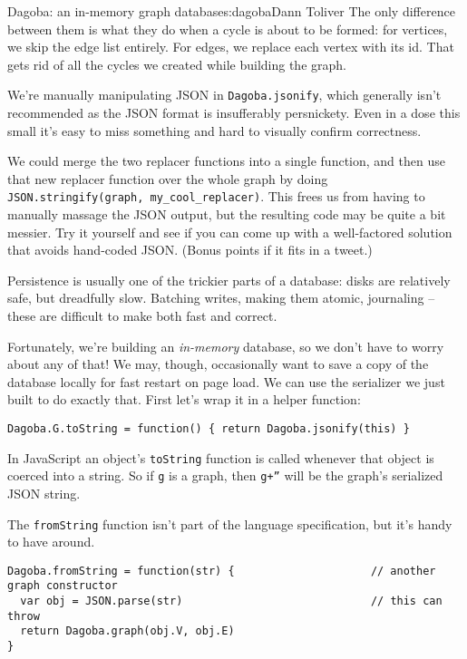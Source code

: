 \begin{aosachapter}{Dagoba: an in-memory graph database}{s:dagoba}{Dann Toliver}
The only difference between them is what they do when a cycle is about
to be formed: for vertices, we skip the edge list entirely. For edges,
we replace each vertex with its id. That gets rid of all the cycles we
created while building the graph.

We're manually manipulating JSON in \texttt{Dagoba.jsonify}, which
generally isn't recommended as the JSON format is insufferably
persnickety. Even in a dose this small it's easy to miss something and
hard to visually confirm correctness.

We could merge the two replacer functions into a single function, and
then use that new replacer function over the whole graph by doing
\texttt{JSON.stringify(graph, my\_cool\_replacer)}. This frees us from
having to manually massage the JSON output, but the resulting code may
be quite a bit messier. Try it yourself and see if you can come up with
a well-factored solution that avoids hand-coded JSON. (Bonus points if
it fits in a tweet.)

\label{persistence}

Persistence is usually one of the trickier parts of a database: disks
are relatively safe, but dreadfully slow. Batching writes, making them
atomic, journaling -- these are difficult to make both fast and correct.

Fortunately, we're building an \emph{in-memory} database, so we don't
have to worry about any of that! We may, though, occasionally want to
save a copy of the database locally for fast restart on page load. We
can use the serializer we just built to do exactly that. First let's
wrap it in a helper function:

\begin{verbatim}
Dagoba.G.toString = function() { return Dagoba.jsonify(this) }
\end{verbatim}

In JavaScript an object's \texttt{toString} function is called whenever
that object is coerced into a string. So if \texttt{g} is a graph, then
\texttt{g+''} will be the graph's serialized JSON string.

The \texttt{fromString} function isn't part of the language
specification, but it's handy to have around.

\begin{verbatim}
Dagoba.fromString = function(str) {                     // another graph constructor
  var obj = JSON.parse(str)                             // this can throw
  return Dagoba.graph(obj.V, obj.E) 
}
\end{verbatim}


\end{aosachapter}
